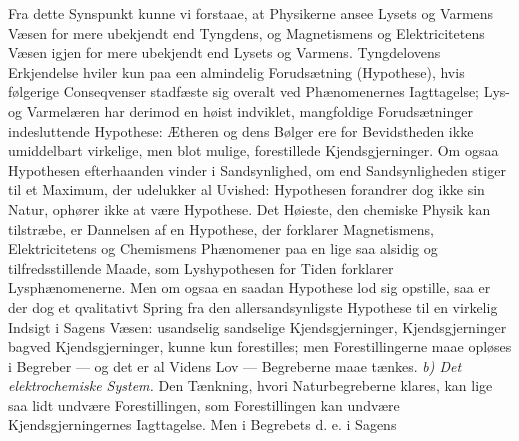 \documentclass[12pt,a4paper]{book}
\newcommand{\runin}[1]{\emph{#1}\hspace{0.4em}}
\begin{document}
Fra dette Synspunkt kunne vi forstaae, at Physikerne ansee Lysets og
Varmens Væsen for mere ubekjendt end Tyngdens, og Magnetismens og
Elektricitetens Væsen igjen for mere ubekjendt end Lysets og Varmens.
Tyngdelovens Erkjendelse hviler kun paa een almindelig Forudsætning
(Hypothese), hvis følgerige Conseqvenser stadfæste sig overalt ved
Phænomenernes Iagttagelse; Lys- og Varmelæren har derimod en høist
indviklet, mangfoldige Forudsætninger indesluttende Hypothese: Ætheren og
dens Bølger ere for Bevidstheden ikke umiddelbart virkelige, men blot
mulige, forestillede Kjendsgjerninger. Om ogsaa Hypothesen efterhaanden
vinder i Sandsynlighed, om end Sandsynligheden stiger til et Maximum, der
udelukker al Uvished: Hypothesen forandrer dog ikke sin Natur, ophører
ikke at være Hypothese. Det Høieste, den chemiske Physik kan tilstræbe, er
Dannelsen af en Hypothese, der forklarer Magnetismens, Elektricitetens og
Chemismens Phænomener paa en lige saa alsidig og tilfredsstillende Maade,
som Lyshypothesen for Tiden forklarer Lysphænomenerne. Men om ogsaa en
saadan Hypothese lod sig opstille, saa er der dog et qvalitativt Spring
fra den allersandsynligste Hypothese til en virkelig Indsigt i Sagens
Væsen: usandselig sandselige Kjendsgjerninger, Kjendsgjerninger bagved
Kjendsgjerninger, kunne kun forestilles; men Forestillingerne maae opløses
i Begreber --- og det er al Videns Lov --- Begreberne maae tænkes.
\runin{b) Det elektrochemiske System.} Den Tænkning, hvori Naturbegreberne
klares, kan lige saa lidt undvære Forestillingen, som Forestillingen kan
undvære Kjendsgjerningernes Iagttagelse. Men i Begrebets d. e. i Sagens
\end{document}
